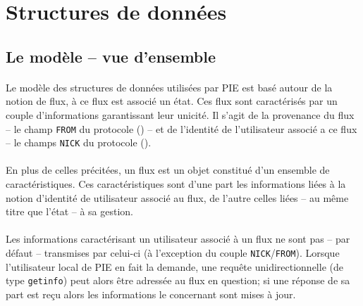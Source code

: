 

\section{Structures de données}
\label{section:storage}

\subsection{Le modèle -- vue d'ensemble}

\paragraph{}

Le modèle des structures de données utilisées par PIE est basé autour de la notion de
flux, à ce flux est associé un état. Ces flux sont caractérisés par un couple d'informations
garantissant leur unicité. Il s'agit de la provenance du flux -- le champ \texttt{FROM} du protocole
() -- et de l'identité de l'utilisateur associé a ce flux -- le champs \texttt{NICK}
du protocole ().


\paragraph{}

En plus de celles précitées, un flux est un objet constitué d'un ensemble de caractéristiques.
Ces caractéristiques sont d'une part les informations liées à la notion d'identité de utilisateur
associé au flux, de l'autre celles liées -- au même titre que l'état -- à sa gestion.


\paragraph{}

Les informations caractérisant un utilisateur associé à un flux ne sont pas -- par défaut --
transmises par celui-ci (à l'exception du couple \texttt{NICK}/\texttt{FROM}). Lorsque 
l'utilisateur local de PIE en fait la demande, une requête unidirectionnelle (de type \texttt{getinfo})
peut alors être adressée au flux en question; si une réponse de sa part est reçu alors
les informations le concernant sont mises à jour.


\paragraph{}

